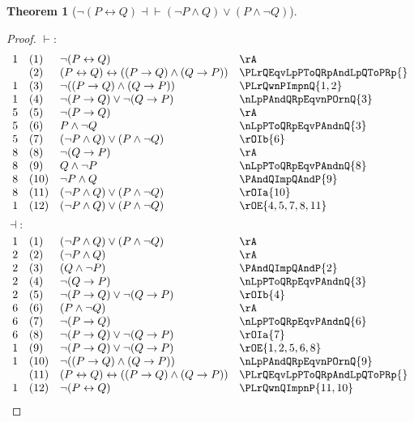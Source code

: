 \documentclass{book}
\theoremstyle{plain}
\newtheorem{theorem}{Theorem}
\theoremstyle{remark}
\theoremstyle{definition}
\begin{document}
\label{nLpPLrQRpEqvLpnPAndQRpOrLpPAndnQRp}
\begin{theorem}[\(\neg (P\leftrightarrow Q)\dashv\vdash (\neg P\land Q)\lor (P\land \neg Q)\)]
\end{theorem}
\begin{proof}
	\(\vdash:\)
	\[
	\begin{array}{llll}
		1 & (1) & \neg(P\leftrightarrow Q) & \rA \\
		& (2) & (P\leftrightarrow Q)\leftrightarrow ((P\rightarrow Q)\land (Q\rightarrow P)) & \PLrQEqvLpPToQRpAndLpQToPRp{} \\		
		1 & (3) & \neg((P\rightarrow Q)\land (Q\rightarrow P)) & \PLrQwnPImpnQ{1,2} \\
		1 & (4) & \neg(P\rightarrow Q)\lor \neg(Q\rightarrow P) & \nLpPAndQRpEqvnPOrnQ{3} \\
		5 & (5) & \neg(P\rightarrow Q) & \rA \\
		5 & (6) & P\land \neg Q & \nLpPToQRpEqvPAndnQ{3} \\
		5 & (7) & (\neg P\land Q)\lor (P\land \neg Q) & \rOIb{6} \\
		8 & (8) & \neg(Q\rightarrow P) & \rA \\
		8 & (9) & Q\land \neg P & \nLpPToQRpEqvPAndnQ{8} \\
		8 & (10) & \neg P \land Q & \PAndQImpQAndP{9} \\
		8 & (11) & (\neg P\land Q)\lor (P\land \neg Q) & \rOIa{10} \\
		1 & (12) & (\neg P\land Q)\lor (P\land \neg Q) & \rOE{4,5,7,8,11} \\
	\end{array}
	\]
	\(\dashv:\)
	\[
	\begin{array}{llll}
		1 & (1) & (\neg P\land Q)\lor (P\land \neg Q) & \rA \\
		2 & (2) & (\neg P\land Q) & \rA \\
		2 & (3) & (Q\land \neg P) & \PAndQImpQAndP{2} \\
		2 & (4) & \neg(Q\rightarrow P) & \nLpPToQRpEqvPAndnQ{3} \\
		2 & (5) & \neg(P\rightarrow Q)\lor \neg(Q\rightarrow P) & \rOIb{4} \\
		6 & (6) & (P\land \neg Q) & \rA \\
		6 & (7) & \neg (P\rightarrow Q) & \nLpPToQRpEqvPAndnQ{6} \\
		6 & (8) & \neg(P\rightarrow Q)\lor \neg(Q\rightarrow P) & \rOIa{7} \\
		1 & (9) & \neg(P\rightarrow Q)\lor \neg(Q\rightarrow P) & \rOE{1,2,5,6,8}\\
		1 & (10) & \neg ((P\rightarrow Q)\land (Q\rightarrow P)) & \nLpPAndQRpEqvnPOrnQ{9} \\
		& (11) & (P\leftrightarrow Q)\leftrightarrow ((P\rightarrow Q)\land (Q\rightarrow P)) & \PLrQEqvLpPToQRpAndLpQToPRp{} \\	
		1 & (12) & \neg (P\leftrightarrow Q) & \PLrQwnQImpnP{11,10} \\	
	\end{array}
	\]
\end{proof}
\end{document}
